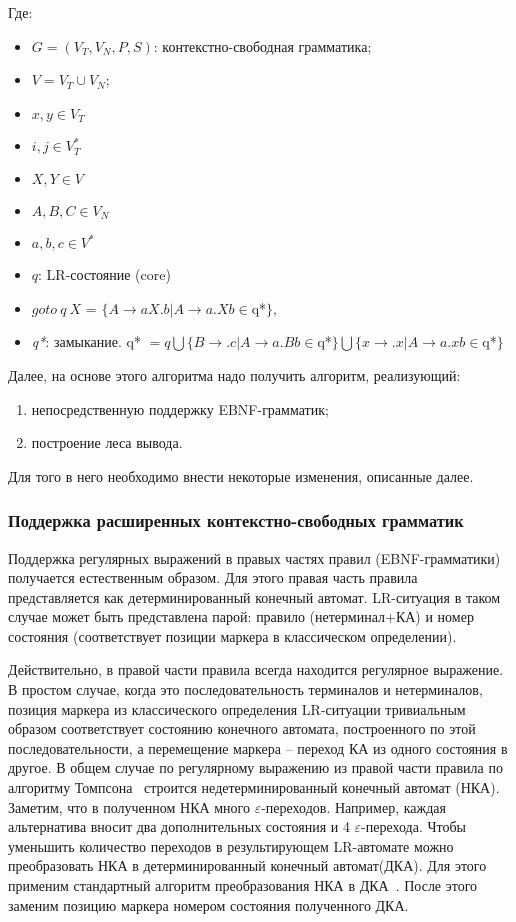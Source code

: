 Где:
\begin{itemize}
  \item $G=(V_T,V_N,P,S)$: контекстно-свободная грамматика;
  \item $V = V_T \cup V_N$;  
  \item $x,y \in V_T$
  \item $i,j \in V_T^*$
  \item $X,Y \in V$
  \item $A,B,C \in V_N$
  \item $a,b,c \in V^*$ 
  \item $q$: LR-состояние (core) 
	\item $goto \ q \ X $ = $\{A\stackrel{}{\rightarrow}aX.b | A\rightarrow a.Xb \in $q*$\}, $
  \item \textit{q*}: замыкание. q* $= q \bigcup \{B\rightarrow.c | A \rightarrow a.Bb \in $q*$\} \bigcup \{x\stackrel{}{\rightarrow}.x | A\stackrel{}{\rightarrow} a.xb \in $q*$\}$~\cite{DrgBook}
\end{itemize}

Далее, на основе этого алгоритма надо получить алгоритм, реализующий:
\begin{enumerate}
 	\item непосредственную поддержку EBNF-грамматик;
 	\item построение леса вывода.
 \end{enumerate} 

Для того в него необходимо внести некоторые изменения, описанные далее.

\subsubsection{Поддержка расширенных контекстно-свободных грамматик}

Поддержка регулярных выражений в правых частях правил (EBNF-грамматики) получается естественным образом. Для этого правая часть правила представляется как детерминированный конечный автомат. LR-ситуация в таком случае может быть представлена парой: правило (нетерминал+КА) и номер состояния (соответствует позиции маркера в классическом определении).

Действительно, в правой части правила всегда находится регулярное выражение. В простом случае, когда это последовательность терминалов и нетерминалов, позиция маркера из классического определения LR-ситуации тривиальным образом соответствует состоянию конечного автомата, построенного по этой последовательности, а перемещение маркера -- переход КА из одного состояния в другое. В общем случае по  регулярному выражению из правой части правила по алгоритму Томпсона~\cite{DrgBook} строится недетерминированный конечный автомат (НКА). Заметим, что в полученном НКА много $\varepsilon$-переходов. Например, каждая альтернатива вносит два дополнительных состояния и 4 $\varepsilon$-перехода. Чтобы уменьшить количество переходов в результирующем LR-автомате можно преобразовать НКА в детерминированный конечный автомат(ДКА). Для этого применим стандартный алгоритм преобразования НКА в ДКА~\cite{DrgBook}. После этого заменим позицию маркера номером состояния полученного ДКА.
 
